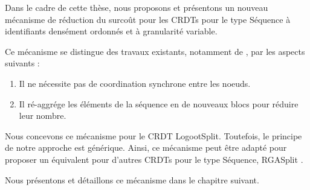 \label{sec:etat-art-proposition}

Dans le cadre de cette thèse, nous proposons et présentons un nouveau mécanisme de réduction du surcoût pour les \acp{CRDT} pour le type Séquence à identifiants densément ordonnés et à granularité variable.

Ce mécanisme se distingue des travaux existants, notamment de \cite{letia:hal-01248270,zawirski:hal-01248197}, par les aspects suivants :
\begin{enumerate}
    \item Il ne nécessite pas de coordination synchrone entre les noeuds.
    \item Il ré-aggrége les éléments de la séquence en de nouveaux blocs pour réduire leur nombre.
\end{enumerate}

Nous concevons ce mécanisme pour le \ac{CRDT} LogootSplit.
Toutefois, le principe de notre approche est générique.
Ainsi, ce mécanisme peut être adapté pour proposer un équivalent pour d'autres \acp{CRDT} pour le type Séquence, \eg RGASplit \cite{briot:hal-01343941}.

Nous présentons et détaillons ce mécanisme dans le chapitre suivant.
